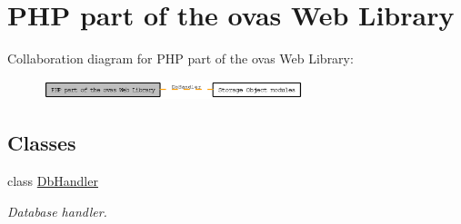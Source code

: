 \hypertarget{group__OWL__PHP}{
\section{PHP part of the ovas Web Library}
\label{group__OWL__PHP}
}


Collaboration diagram for PHP part of the ovas Web Library:\nopagebreak
\begin{figure}[H]
\begin{center}
\leavevmode
\includegraphics[width=214pt]{group__OWL__PHP}
\end{center}
\end{figure}
\subsection*{Classes}
\begin{CompactItemize}
\item 
class \hyperlink{classDbHandler}{DbHandler}
\begin{CompactList}\small\item\em Database handler. \item\end{CompactList}\end{CompactItemize}
